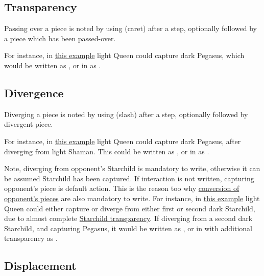 \subsection*{Transparency}
\label{sec:Appendix/Notation/Transparency}

Passing over a piece is noted by using \alg{\^{}} (caret) after a step,
optionally followed by a piece which has been passed-over.

For instance, in \hyperref[fig:scn_mv_07_wave_is_transparent]{this example} light Queen
could capture dark Pegasus, which would be written as\newline
{}, or in  as\newline
{}.

\subsection*{Divergence}
\label{sec:Appendix/Notation/Divergence}

Diverging a piece is noted by using \alg{/} (slash) after a step, optionally followed
by divergent piece.

For instance, in \hyperref[fig:scn_cot_030_own_shaman_is_divergent_init]{this example}
light Queen could capture dark Pegasus, after diverging from light Shaman.
This could be written as , or in  as .

Note, diverging from opponent's Starchild is mandatory to write, otherwise it
can be assumed Starchild has been captured. If interaction is not written,
capturing opponent's piece is default action. This is the reason too why
\hyperref[sec:Appendix/Notation/Conversion]{conversion of opponent's pieces}
are also mandatory to write.\newline
\indent
For instance, in
\hyperref[fig:scn_o_31_starchild_divergence_end]{this example} light Queen
could either capture or diverge from either first or second dark Starchild,
due to almost complete
\hyperref[fig:scn_o_15_starchild_is_transparent]{Starchild transparency}.
If diverging from a second dark Starchild, and capturing Pegasus, it would
be written as , or in  with additional transparency
as .

\subsection*{Displacement}
\label{sec:Appendix/Notation/Displacement}

